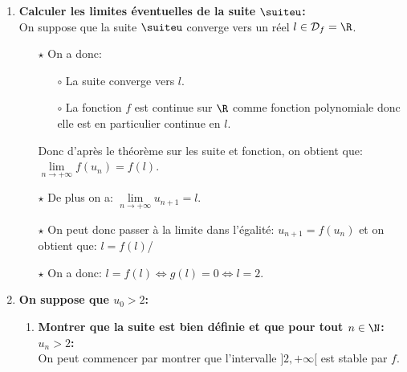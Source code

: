 \begin{correction}
\begin{enumerate}
\item \textbf{Calculer les limites \'eventuelles de la suite $\suiteu$:}\\
\noindent On suppose que la suite $\suiteu$ converge vers un r\'eel $l\in\mathcal{D}_f=\R$.
\begin{itemize}
\item[$\star$] On a donc:
\begin{itemize}
\item[$\circ$] La suite converge vers $l$.
\item[$\circ$] La fonction $f$ est continue sur $\R$ comme fonction polynomiale donc elle est en particulier continue en $l$.
\end{itemize}
Donc d'apr\`{e}s le th\'eor\`{e}me sur les suite et fonction, on obtient que: $\lim\limits_{n\to +\infty} f(u_n)=f(l)$.
\item[$\star$] De plus on a: $\lim\limits_{n\to +\infty} u_{n+1}=l$.
\item[$\star$] On peut donc passer \`{a} la limite dans l'\'egalit\'e: $u_{n+1}=f(u_n)$ et on obtient que: $l=f(l)$/
\item[$\star$] On a donc: $l=f(l)\Leftrightarrow g(l)=0\Leftrightarrow l=2$. \\
\noindent {}
\end{itemize}
\item \textbf{On suppose que $u_0>2$:}
\begin{enumerate}
\item \textbf{Montrer que la suite est bien d\'efinie et que pour tout $n\in\N$: $u_n>2$:}\\
\noindent On peut commencer par montrer que l'intervalle $\rbrack 2,+\infty\lbrack$ est stable par $f$. 

\end{enumerate}
\end{enumerate}
\end{correction}
